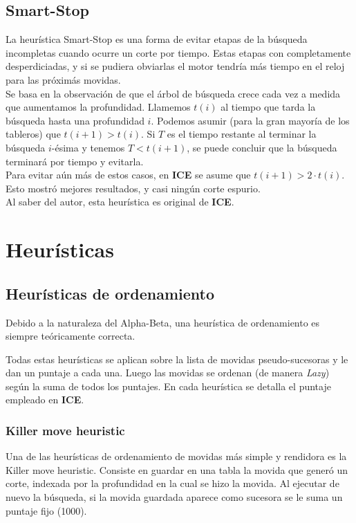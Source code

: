 \documentclass{article}
\newcommand{\ICE}[0]{{\bf ICE}}
\begin{document}
\begin{multicols}{2}
\subsection{Smart-Stop}

La heurística Smart-Stop es una forma de evitar etapas de la búsqueda
incompletas cuando ocurre un corte por tiempo. Estas etapas con
completamente desperdiciadas, y si se pudiera obviarlas el motor
tendría más tiempo en el reloj para las próximás movidas.
\\

Se basa en la observación de que el árbol de búsqueda crece cada vez
a medida que aumentamos la profundidad. Llamemos $t(i)$ al tiempo que
tarda la búsqueda hasta una profundidad $i$. Podemos asumir (para la
gran mayoría de los tableros) que $t(i+1) > t(i)$. Si $T$ es el tiempo
restante al terminar la búsqueda $i$-ésima y tenemos $T < t(i+1)$, se
puede concluir que la búsqueda terminará por tiempo y evitarla.
\\

Para evitar aún más de estos casos, en \ICE{} se asume que $t(i+1) >
2 \cdot t(i)$. Esto mostró mejores resultados, y casi ningún corte
espurio.
\\

Al saber del autor, esta heurística es original de \ICE{}.

\section{Heurísticas}

\subsection{Heurísticas de ordenamiento}

Debido a la naturaleza del Alpha-Beta, una heurística de ordenamiento
es siempre teóricamente correcta.

Todas estas heurísticas se aplican sobre la lista de movidas
pseudo-sucesoras y le dan un puntaje a cada una. Luego las movidas se
ordenan (de manera \emph{Lazy}) según la suma de todos los puntajes. En
cada heurística se detalla el puntaje empleado en \ICE{}.

\subsubsection{Killer move heuristic}
Una de las heurísticas de ordenamiento de movidas más simple y
rendidora es la Killer move heuristic. Consiste en guardar en una tabla
la movida que generó un corte, indexada por la profundidad en la cual
se hizo la movida. Al ejecutar de nuevo la búsqueda, si la movida
guardada aparece como sucesora se le suma un puntaje fijo (1000).
\\


\end{multicols}
\end{document}
